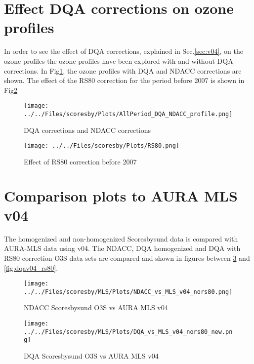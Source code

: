     \section{Effect DQA corrections on ozone profiles }
%
    In order to see the effect of DQA corrections, explained in Sec.\ref{sec:v04}, on the ozone profiles
the ozone profiles have been
explored with and without DQA corrections. In Fig\ref{fig:pl_ndacc}, the ozone profiles with DQA and
NDACC corrections are shown.
The effect of the RS80 correction for the period before 2007 is shown in Fig\ref{fig:op_rs80}
                                \begin{figure}
        \centering
\texttt{[image: ../../Files/scoresby/Plots/AllPeriod\_DQA\_NDACC\_profile.png]}
    \caption{DQA corrections and NDACC corrections}
            \label{fig:pl_ndacc}
    \end{figure}
                                    \begin{figure}
        \centering
\texttt{[image: ../../Files/scoresby/Plots/RS80.png]}
    \caption{Effect of RS80 correction before 2007}
            \label{fig:op_rs80}
    \end{figure}

\section{Comparison plots to AURA MLS v04}

    The homogenized and non-homogenized Scoresbysund data is compared with AURA-MLS data using v04. The
    NDACC, DQA homogenized and DQA with RS80 correction O3S data sets are compared and shown in figures between
\ref{fig:niwav04} and \ref{fig:dqav04_rs80}.

                                \begin{figure}
        \centering
\texttt{[image: ../../Files/scoresby/MLS/Plots/NDACC\_vs\_MLS\_v04\_nors80.png]}
    \caption{ NDACC Scoresbysund O3S vs AURA MLS v04  }
            \label{fig:niwav04}
    \end{figure}

                            \begin{figure}
        \centering
\texttt{[image: ../../Files/scoresby/MLS/Plots/DQA\_vs\_MLS\_v04\_nors80\_new.png]}
    \caption{DQA Scoresbysund O3S vs AURA MLS v04 }
            \label{fig:dqav04}
    \end{figure}


